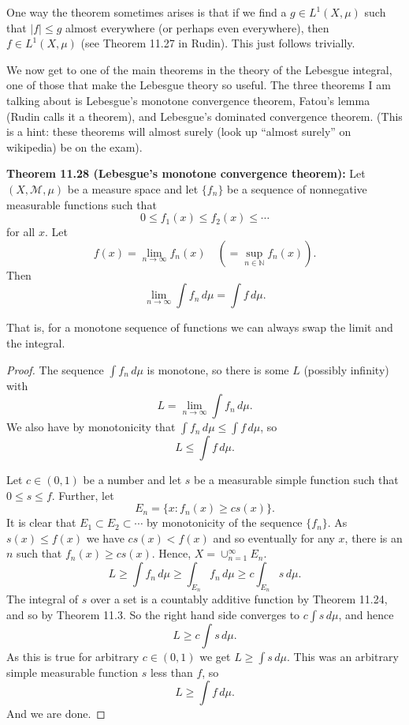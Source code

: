 \documentclass[12pt]{book}
\newcommand{\abs}[1]{\left\lvert {#1} \right\rvert}
\newcommand{\N}{{\mathbb{N}}}
\newcommand{\sM}{{\mathcal{M}}}
\theoremstyle{plain}
\theoremstyle{remark}
\theoremstyle{definition}
\theoremstyle{exercise}
\theoremstyle{example}
\begin{document}
\medskip

One way the theorem sometimes arises is that if we find a $g \in L^1(X,\mu)$
such that $\abs{f} \leq g$ almost everywhere (or perhaps even everywhere),
then $f \in L^1(X,\mu)$ (see Theorem 11.27 in Rudin).  This just follows
trivially.

We now get to one of the main theorems in the theory of
the Lebesgue integral, one of those that make the Lebesgue
theory so useful.  The three theorems I am talking about is
Lebesgue's monotone convergence theorem, Fatou's lemma (Rudin calls it a
theorem), and Lebesgue's dominated convergence theorem.
(This is a hint: these theorems will almost surely (look up
``almost surely'' on wikipedia) be on the exam).

\medskip

\textbf{Theorem 11.28 (Lebesgue's monotone convergence theorem):}
Let $(X,\sM,\mu)$ be a measure space and let $\{ f_n \}$
be a sequence of nonnegative measurable functions such that
$$
0 \leq f_1(x) \leq f_2(x) \leq \cdots
$$
for all $x$.  Let
$$
f(x) = \lim_{n \to \infty} f_n(x) \quad \left( = \sup_{n\in \N} f_n(x)
\right) .
$$
Then
$$
\lim_{n\to\infty} \int f_n \, d\mu = \int f \, d\mu .
$$

\medskip

That is, for a monotone sequence of functions we can always swap the limit
and the integral.

\medskip

\begin{proof}
The sequence $\int f_n \, d\mu$ is monotone, so there is some $L$
(possibly infinity) with
$$
L = \lim_{n\to\infty} \int f_n \, d\mu .
$$
We also have by monotonicity that $\int f_n\, d\mu \leq \int f\, d\mu$, so
$$
L \leq \int f\, d\mu .
$$

Let $c \in (0,1)$ be a number and let $s$ be a measurable simple function
such that $0 \leq s \leq f$.  Further, let
$$
E_n = \{ x : f_n(x) \geq c s(x) \} .
$$
It is clear that $E_1 \subset E_2 \subset \cdots$ by monotonicity of the
sequence $\{ f_n \}$.  As $s(x) \leq f(x)$ we have $cs(x) < f(x)$ and
so eventually for any $x$, there is an $n$ such that $f_n(x) \geq cs(x)$.
Hence, $X = \cup_{n=1}^\infty E_n$.
$$
L \geq \int f_n\, d\mu \geq \int_{E_n} f_n\, d\mu \geq c \int_{E_n} s\, d\mu .
$$
The integral of $s$ over a set is a countably additive function by Theorem
11.24, and so by Theorem 11.3.  So the right hand side converges to
$c\int s\,d\mu$, and hence
$$
L \geq c \int s\, d\mu .
$$
As this is true for arbitrary $c \in (0,1)$ we get $L \geq \int s\, d\mu$.
This was an arbitrary simple measurable function $s$ less than $f$, so
$$
L \geq \int f\, d\mu .
$$
And we are done.
\end{proof}
\end{document}
